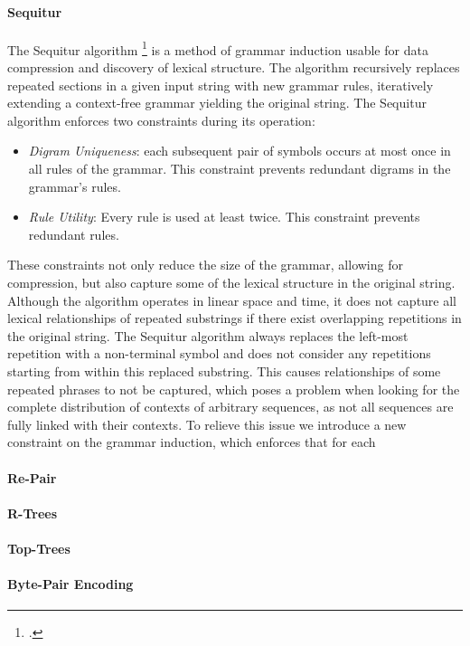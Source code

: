 \paragraph{Sequitur}
The Sequitur algorithm \footcite{nevill1997identifying} is a method of grammar induction 
usable for data compression and discovery of lexical structure. The algorithm 
recursively replaces repeated sections in a given input string with new grammar rules, iteratively extending a context-free grammar yielding the original string. The Sequitur algorithm enforces two constraints during its operation:
\begin{itemize}
    \item \textit{Digram Uniqueness}: each subsequent pair of symbols occurs at most once in all rules of the grammar. This constraint prevents redundant digrams in the grammar's rules.
    \item \textit{Rule Utility}: Every rule is used at least twice. This constraint prevents redundant rules.
\end{itemize}
These constraints not only reduce the size of the grammar, allowing for compression, but also capture some of the lexical structure in the original string. Although the algorithm operates in linear space and time, it does not capture all lexical relationships of repeated substrings if there exist overlapping repetitions in the original string. The Sequitur algorithm always replaces the left-most repetition with a non-terminal symbol and does not consider any repetitions starting from within this replaced substring. This causes relationships of some repeated phrases to not be captured, which poses a problem when looking for the complete distribution of contexts of arbitrary sequences, as not all sequences are fully linked with their contexts.
To relieve this issue we introduce a new constraint on the grammar induction, which enforces that for each 
\paragraph{Re-Pair}
\paragraph{R-Trees}
\paragraph{Top-Trees}
\paragraph{Byte-Pair Encoding}
